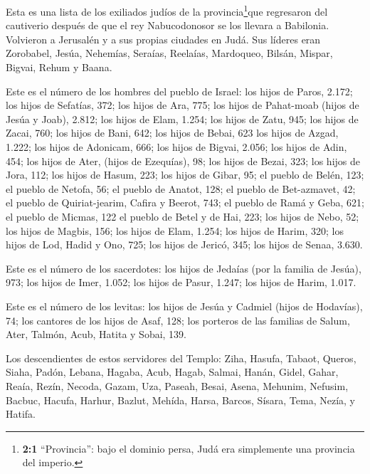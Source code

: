  Esta es una lista de los exiliados judíos de la
provincia\footnote{\textbf{2:1} ``Provincia'': bajo el dominio persa,
  Judá era simplemente una provincia del imperio.}que regresaron del
cautiverio después de que el rey Nabucodonosor se los llevara a
Babilonia. Volvieron a Jerusalén y a sus propias ciudades en Judá.
 Sus líderes eran Zorobabel, Jesúa, Nehemías, Seraías,
Reelaías, Mardoqueo, Bilsán, Mispar, Bigvai, Rehum y Baana.

Este es el número de los hombres del pueblo de Israel:  los
hijos de Paros, 2.172;  los hijos de Sefatías, 372;
 los hijos de Ara, 775;  los hijos de Pahat-moab
(hijos de Jesúa y Joab), 2.812;  los hijos de Elam, 1.254;
 los hijos de Zatu, 945;  los hijos de Zacai,
760;  los hijos de Bani, 642;  los hijos de
Bebai, 623  los hijos de Azgad, 1.222;  los
hijos de Adonicam, 666;  los hijos de Bigvai, 2.056;
 los hijos de Adin, 454;  los hijos de Ater,
(hijos de Ezequías), 98;  los hijos de Bezai, 323;
 los hijos de Jora, 112;  los hijos de Hasum,
223;  los hijos de Gibar, 95;  el pueblo de
Belén, 123;  el pueblo de Netofa, 56;  el
pueblo de Anatot, 128;  el pueblo de Bet-azmavet, 42;
 el pueblo de Quiriat-jearim, Cafira y Beerot, 743;
 el pueblo de Ramá y Geba, 621;  el pueblo de
Micmas, 122  el pueblo de Betel y de Hai, 223;
 los hijos de Nebo, 52;  los hijos de Magbis,
156;  los hijos de Elam, 1.254;  los hijos de
Harim, 320;  los hijos de Lod, Hadid y Ono, 725;
 los hijos de Jericó, 345;  los hijos de
Senaa, 3.630.

 Este es el número de los sacerdotes: los hijos de Jedaías
(por la familia de Jesúa), 973;  los hijos de Imer, 1.052;
 los hijos de Pasur, 1.247;  los hijos de
Harim, 1.017.

 Este es el número de los levitas: los hijos de Jesúa y
Cadmiel (hijos de Hodavías), 74;  los cantores de los hijos
de Asaf, 128;  los porteros de las familias de Salum, Ater,
Talmón, Acub, Hatita y Sobai, 139.

 Los descendientes de estos servidores del Templo: Ziha,
Hasufa, Tabaot,  Queros, Siaha, Padón, 
Lebana, Hagaba, Acub,  Hagab, Salmai, Hanán, 
Gidel, Gahar, Reaía,  Rezín, Necoda, Gazam, 
Uza, Paseah, Besai,  Asena, Mehunim, Nefusim, 
Bacbuc, Hacufa, Harhur,  Bazlut, Mehída, Harsa,
 Barcos, Sísara, Tema,  Nezía, y Hatifa.

